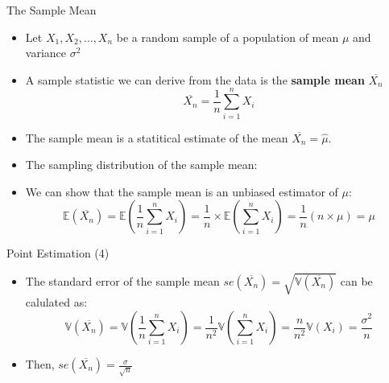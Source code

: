 \documentclass[handout]{beamer}
\begin{document}
\begin{frame}{The Sample Mean}
\scriptsize{

\begin{itemize}
 \item Let $X_1,X_2,\dots,X_n$ be a random sample of a population of mean $\mu$ and variance $\sigma^2$
 \item  A sample statistic we can derive from the data is the  \textbf{sample mean} $\overline{X_{n}}$
 \begin{displaymath}
  \overline{X_{n}}=\frac{1}{n}\sum_{i=1}^{n} X_i
 \end{displaymath}
 \item The sample mean is a statitical estimate of the mean $\overline{X_{n}} = \hat{\mu}$.
 \item The sampling distribution of the sample mean: 
 
 
\item We can show that the sample mean is an unbiased estimator of $\mu$:
\begin{displaymath}
\mathbb{E}(\overline{X_{n}}) = \mathbb{E}(\frac 1n \sum_{i=1}^{n} X_i)  =  \frac 1n \times \mathbb{E}(\sum_{i=1}^{n} X_i) = \frac 1n (n \times \mu) = \mu  
\end{displaymath}
\end{itemize}

} 
\end{frame}

\begin{frame}{Point Estimation (4)}
\scriptsize{

\begin{itemize}
\item The standard error of the sample mean $se(\overline{X_{n}}) = \sqrt{\mathbb{V}(\overline{X_{n}})}$ can be calulated as:
\begin{displaymath}
 \mathbb{V}(\overline{X_{n}})=\mathbb{V}(\frac 1n \sum_{i=1}^{n} X_i) = \frac{1}{n^2} \mathbb{V}(\sum_{i=1}^{n} X_i) = \frac{n}{n^2} \mathbb{V}(X_i)=\frac{\sigma^2}{n} 
\end{displaymath}

\item Then,  $se(\overline{X_{n}}) = \frac{\sigma}{\sqrt{n}}$

\end{itemize}


} 
\end{frame}
\end{document}
